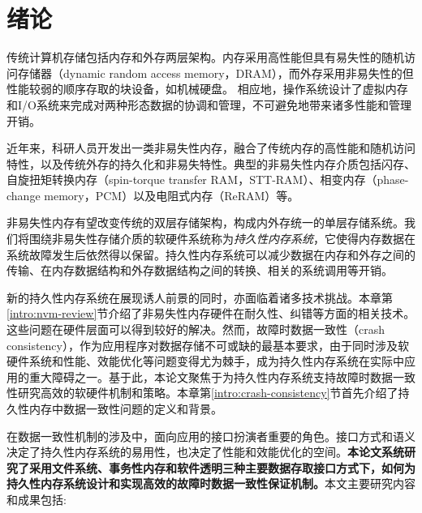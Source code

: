 \chapter{绪论}
\label{chap:intro}

传统计算机存储包括内存和外存两层架构。内存采用高性能但具有易失性的随机访问存储器（dynamic random access memory，DRAM），而外存采用非易失性的但性能较弱的顺序存取的块设备，如机械硬盘。
相应地，操作系统设计了虚拟内存和I/O系统\cite{Galvin:2013:OSC:2531466,Tanenbaum:2014:MOS:2655363}来完成对两种形态数据的协调和管理，不可避免地带来诸多性能和管理开销\cite{Lang:1977:DBP:320576.320585,Yu:2014:OBI:2642648.2619092}。

近年来，科研人员开发出一类非易失性内存，融合了传统内存的高性能和随机访问特性，以及传统外存的持久化和非易失特性。典型的非易失性内存介质包括闪存\cite{705361,542301}、自旋扭矩转换内存（spin-torque transfer RAM，STT-RAM）\cite{4443191,6557176}、相变内存（phase-change memory，PCM）\cite{Loke22062012,6176872,Raoux:2008:PRA,10.1109/MM.2010.24}以及电阻式内存（ReRAM）\cite{5607274}等。

非易失性内存有望改变传统的双层存储架构，构成内外存统一的单层存储系统。我们将围绕非易失性存储介质的软硬件系统称为\emph{持久性内存系统}，它使得内存数据在系统故障发生后依然得以保留。持久性内存系统可以减少数据在内存和外存之间的传输、在内存数据结构和外存数据结构之间的转换、相关的系统调用等开销\cite{meza2013case}。

新的持久性内存系统在展现诱人前景的同时，亦面临着诸多技术挑战。本章第\ref{intro:nvm-review}节介绍了非易失性内存硬件在耐久性、纠错等方面的相关技术。这些问题在硬件层面可以得到较好的解决。然而，故障时数据一致性（crash consistency），作为应用程序对数据存储不可或缺的最基本要求，由于同时涉及软硬件系统和性能、效能优化等问题变得尤为棘手，成为持久性内存系统在实际中应用的重大障碍之一\cite{Onur:2014:RPO}。基于此，本论文聚焦于为持久性内存系统支持故障时数据一致性研究高效的软硬件机制和策略。本章第\ref{intro:crash-consistency}节首先介绍了持久性内存中数据一致性问题的定义和背景。

在数据一致性机制的涉及中，面向应用的接口扮演者重要的角色。接口方式和语义决定了持久性内存系统的易用性，也决定了性能和效能优化的空间。\textbf{本论文系统研究了采用文件系统、事务性内存和软件透明三种主要数据存取接口方式下，如何为持久性内存系统设计和实现高效的故障时数据一致性保证机制。}本文主要研究内容和成果包括:

